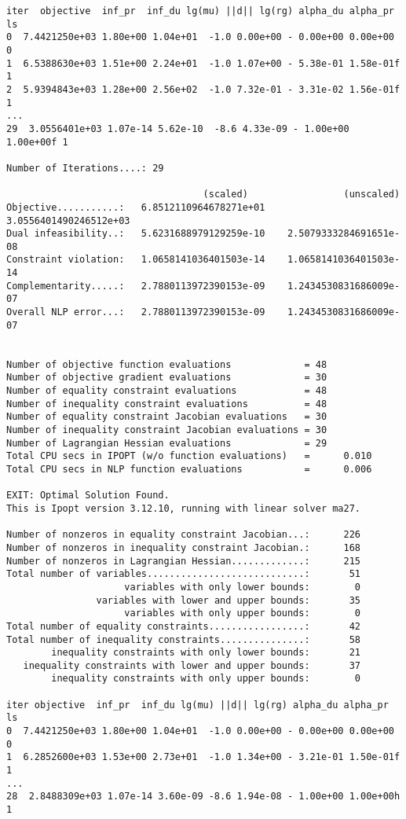\begin{lstlisting}
iter  objective  inf_pr  inf_du lg(mu) ||d|| lg(rg) alpha_du alpha_pr  ls
0  7.4421250e+03 1.80e+00 1.04e+01  -1.0 0.00e+00 - 0.00e+00 0.00e+00   0
1  6.5388630e+03 1.51e+00 2.24e+01  -1.0 1.07e+00 - 5.38e-01 1.58e-01f  1
2  5.9394843e+03 1.28e+00 2.56e+02  -1.0 7.32e-01 - 3.31e-02 1.56e-01f  1
...
29  3.0556401e+03 1.07e-14 5.62e-10  -8.6 4.33e-09 - 1.00e+00 1.00e+00f 1

Number of Iterations....: 29

                                   (scaled)                 (unscaled)
Objective...........:   6.8512110964678271e+01    3.0556401490246512e+03
Dual infeasibility..:   5.6231688979129259e-10    2.5079333284691651e-08
Constraint violation:   1.0658141036401503e-14    1.0658141036401503e-14
Complementarity.....:   2.7880113972390153e-09    1.2434530831686009e-07
Overall NLP error...:   2.7880113972390153e-09    1.2434530831686009e-07


Number of objective function evaluations             = 48
Number of objective gradient evaluations             = 30
Number of equality constraint evaluations            = 48
Number of inequality constraint evaluations          = 48
Number of equality constraint Jacobian evaluations   = 30
Number of inequality constraint Jacobian evaluations = 30
Number of Lagrangian Hessian evaluations             = 29
Total CPU secs in IPOPT (w/o function evaluations)   =      0.010
Total CPU secs in NLP function evaluations           =      0.006

EXIT: Optimal Solution Found.
This is Ipopt version 3.12.10, running with linear solver ma27.

Number of nonzeros in equality constraint Jacobian...:      226
Number of nonzeros in inequality constraint Jacobian.:      168
Number of nonzeros in Lagrangian Hessian.............:      215
Total number of variables............................:       51
                     variables with only lower bounds:        0
                variables with lower and upper bounds:       35
                     variables with only upper bounds:        0
Total number of equality constraints.................:       42
Total number of inequality constraints...............:       58
        inequality constraints with only lower bounds:       21
   inequality constraints with lower and upper bounds:       37
        inequality constraints with only upper bounds:        0

iter objective  inf_pr  inf_du lg(mu) ||d|| lg(rg) alpha_du alpha_pr  ls
0  7.4421250e+03 1.80e+00 1.04e+01  -1.0 0.00e+00 - 0.00e+00 0.00e+00   0
1  6.2852600e+03 1.53e+00 2.73e+01  -1.0 1.34e+00 - 3.21e-01 1.50e-01f  1
...
28  2.8488309e+03 1.07e-14 3.60e-09 -8.6 1.94e-08 - 1.00e+00 1.00e+00h  1


\end{lstlisting}
